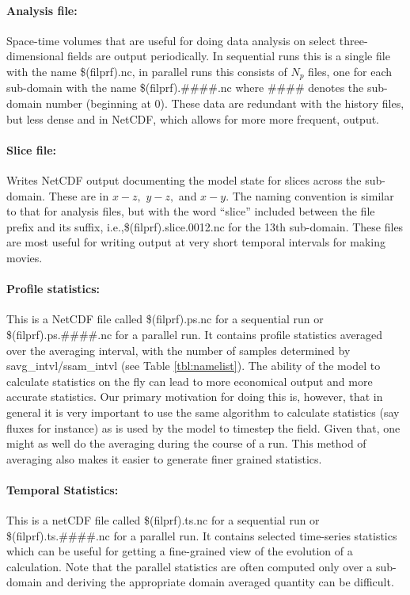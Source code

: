 \documentclass[11pt,a4paper]{article}
\begin{document}
\paragraph{Analysis file:}  Space-time volumes that are useful for doing
data analysis on select three-dimensional fields are output
periodically.  In sequential runs this is a single file with the name
\$(filprf).nc, in parallel runs this consists of $N_p$ files, one for
each sub-domain with the name \$(filprf).\#\#\#\#.nc where \#\#\#\#
denotes the sub-domain number (beginning at 0). These data are
redundant with the history files, but less dense and in NetCDF, which
allows for more more frequent, output. 

\paragraph{Slice file:} Writes NetCDF output documenting the model
state for slices across the sub-domain. These are in $x-z,$ $y-z,$ and
$x-y.$   The naming convention is similar to that for analysis files,
but with the word ``slice'' included between the file prefix and its
suffix, i.e.,\$(filprf).slice.0012.nc for the 13th sub-domain.  These
files are most useful for writing output at very short temporal
intervals for making movies.

\paragraph{Profile statistics:}  This is a NetCDF file called
\$(filprf).ps.nc for a sequential run or \$(filprf).ps.\#\#\#\#.nc for
a parallel run.  It contains profile statistics averaged over the
averaging interval, with the number of samples determined by
savg\_intvl/ssam\_intvl (see Table \ref{tbl:namelist}).  The ability
of the model to calculate statistics on the fly can lead to more
economical output and more accurate statistics.  Our primary
motivation for doing this is, however, that in general it is very
important to use the same algorithm to calculate statistics (say
fluxes for instance) as is used by the model to timestep the field.
Given that, one might as well do the averaging during the course of a
run.  This method of averaging also makes it easier to generate finer
grained statistics.

\paragraph{Temporal Statistics:}  This is a netCDF file called
\$(filprf).ts.nc for a sequential run or \$(filprf).ts.\#\#\#\#.nc for
a parallel run.  It contains selected time-series statistics which can
be useful for getting a fine-grained view of the evolution of a
calculation.  Note that the parallel statistics are often computed
only over a sub-domain and deriving the appropriate domain averaged
quantity can be difficult.
\end{document}
